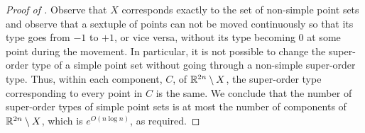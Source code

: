 \documentclass{patmorin}
\begin{document}
\begin{proof}[Proof of ]
   Observe that $X$ corresponds exactly to the set of non-simple
   point sets and observe that a sextuple of points can not be moved
   continuously so that its type goes from $-1$ to $+1$, or vice versa,
   without its type becoming $0$ at some point during the movement.
   In particular, it is not possible to change the super-order type of
   a simple point set without going through a non-simple super-order type.
   Thus, within each component, $C$, of $\mathbb{R}^{2n}\setminus X$, the
   super-order type corresponding to every point in $C$ is the same.
   We conclude that the number of super-order types of simple point
   sets is at most the number of components of $\mathbb{R}^{2n}\setminus X$,
   which is $e^{O(n\log n)}$, as required.
\end{proof}
\end{document}
